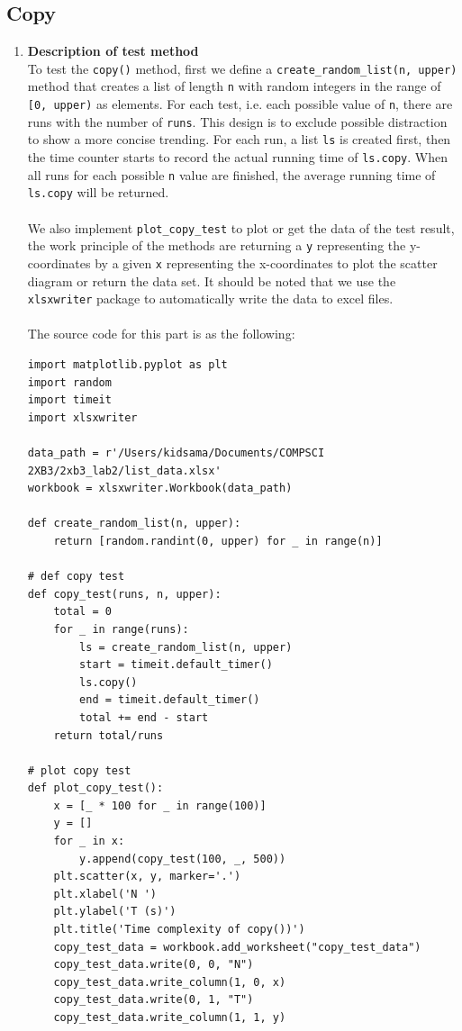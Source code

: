 \documentclass[12pt]{article}
\begin{document}
\subsection{Copy}
\begin{enumerate}[(1)]
\item \textbf{Description of test method}\\
To test the \verb|copy()| method, first we define a \verb|create_random_list(n, upper)| method that creates a list of length \verb|n| with random integers in the range of \verb|[0, upper)| as elements. For each test, i.e. each possible value of \verb|n|, there are runs with the number of \verb|runs|. This design is to exclude possible distraction to show a more concise trending. For each run, a list \verb|ls| is created first, then the time counter starts to record the actual running time of  \verb|ls.copy|. When all runs for each possible \verb|n| value are finished, the average running time of \verb|ls.copy| will be returned. \\\\
We also implement \verb|plot_copy_test| to plot or get the data of the test result, the work principle of the methods are returning a \verb|y| representing the y-coordinates by a given \verb|x| representing the x-coordinates to plot the scatter diagram or return the data set. It should be noted that we use the \verb|xlsxwriter| package to automatically write the data to excel files.\\\\
The source code for this part is as the following:
\lstset{language=Python, basicstyle=\ttfamily\small, breaklines=true, showspaces=false,
  showstringspaces=false, breakatwhitespace=true}
\begin{lstlisting}
import matplotlib.pyplot as plt
import random
import timeit
import xlsxwriter

data_path = r'/Users/kidsama/Documents/COMPSCI 2XB3/2xb3_lab2/list_data.xlsx'
workbook = xlsxwriter.Workbook(data_path)

def create_random_list(n, upper):
    return [random.randint(0, upper) for _ in range(n)]

# def copy test
def copy_test(runs, n, upper):
    total = 0
    for _ in range(runs):
        ls = create_random_list(n, upper)
        start = timeit.default_timer()
        ls.copy()
        end = timeit.default_timer()
        total += end - start
    return total/runs

# plot copy test
def plot_copy_test():
    x = [_ * 100 for _ in range(100)]
    y = []
    for _ in x:
        y.append(copy_test(100, _, 500))
    plt.scatter(x, y, marker='.')
    plt.xlabel('N ')
    plt.ylabel('T (s)')
    plt.title('Time complexity of copy())')
    copy_test_data = workbook.add_worksheet("copy_test_data")
    copy_test_data.write(0, 0, "N")
    copy_test_data.write_column(1, 0, x)
    copy_test_data.write(0, 1, "T")
    copy_test_data.write_column(1, 1, y)
\end{lstlisting}


\end{enumerate}
\end{document}
